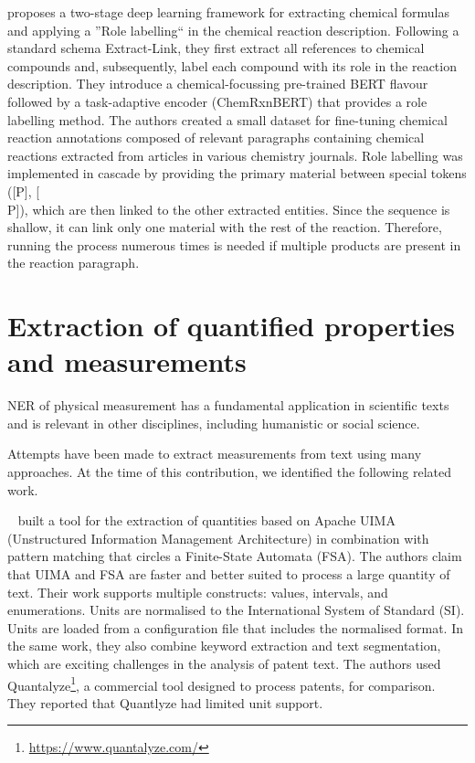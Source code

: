 \cite{guo2021automated} proposes a two-stage deep learning framework for extracting chemical formulas and applying a ''Role labelling`` in the chemical reaction description. 
Following a standard schema Extract-Link, they first extract all references to chemical compounds and, subsequently, label each compound with its role in the reaction description. 
They introduce a chemical-focussing pre-trained BERT flavour followed by a task-adaptive encoder (ChemRxnBERT) that provides a role labelling method. 
The authors created a small dataset for fine-tuning chemical reaction annotations composed of relevant paragraphs containing chemical reactions extracted from articles in various chemistry journals. 
Role labelling was implemented in cascade by providing the primary material between special tokens ([P], [\\P]), which are then linked to the other extracted entities. Since the sequence is shallow, it can link only one material with the rest of the reaction. Therefore, running the process numerous times is needed if multiple products are present in the reaction paragraph.  



\section{Extraction of quantified properties and measurements} 
NER of physical measurement has a fundamental application in scientific texts and is relevant in other disciplines, including humanistic or social science. 

Attempts have been made to extract measurements from text using many approaches. At the time of this contribution, we identified the following related work. 

~\cite{aras2014applications} built a tool for the extraction of quantities based on Apache UIMA (Unstructured Information Management Architecture) in combination with pattern matching that circles a Finite-State Automata (FSA). 
The authors claim that UIMA and FSA are faster and better suited to process a large quantity of text.
Their work supports multiple constructs: values, intervals, and enumerations. Units are normalised to the International System of Standard (SI). 
Units are loaded from a configuration file that includes the normalised format. In the same work, they also combine keyword extraction and text segmentation, which are exciting challenges in the analysis of patent text. 
The authors used Quantalyze\footnote{\url{https://www.quantalyze.com/}}, a commercial tool designed to process patents, for comparison. They reported that Quantlyze had limited unit support. 

